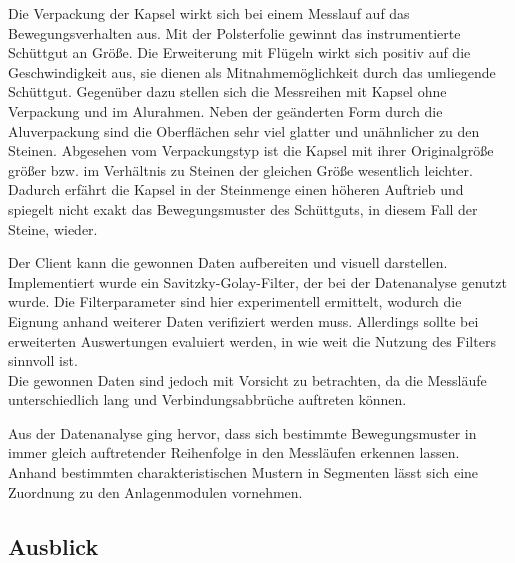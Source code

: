 Die Verpackung der Kapsel wirkt sich bei einem Messlauf auf das Bewegungsverhalten aus. Mit der Polsterfolie gewinnt das instrumentierte Schüttgut an Größe. Die Erweiterung mit Flügeln wirkt sich positiv auf die Geschwindigkeit aus, sie dienen als Mitnahmemöglichkeit durch das umliegende Schüttgut. Gegenüber dazu stellen sich die Messreihen mit Kapsel ohne Verpackung und im Alurahmen. Neben der geänderten Form durch die Aluverpackung sind die Oberflächen sehr viel glatter und unähnlicher zu den Steinen. 
Abgesehen vom Verpackungstyp ist die Kapsel mit ihrer Originalgröße größer bzw. im Verhältnis zu Steinen der gleichen Größe wesentlich leichter. Dadurch erfährt die Kapsel in der Steinmenge einen höheren Auftrieb und spiegelt nicht exakt das Bewegungsmuster des Schüttguts, in diesem Fall der Steine, wieder. 

Der Client kann die gewonnen Daten aufbereiten und visuell darstellen. Implementiert wurde ein Savitzky-Golay-Filter, der bei der Datenanalyse genutzt wurde. Die Filterparameter sind hier experimentell ermittelt, wodurch die Eignung anhand weiterer Daten verifiziert werden muss. Allerdings sollte bei erweiterten Auswertungen evaluiert werden, in wie weit die Nutzung des Filters sinnvoll ist. \\
Die gewonnen Daten sind jedoch mit Vorsicht zu betrachten, da die Messläufe unterschiedlich lang und Verbindungsabbrüche auftreten können. 

Aus der Datenanalyse ging hervor, dass sich bestimmte Bewegungsmuster in immer gleich auftretender Reihenfolge in den Messläufen erkennen lassen. Anhand bestimmten charakteristischen Mustern in Segmenten lässt sich eine Zuordnung zu den Anlagenmodulen vornehmen. 

\subsection{Ausblick}

